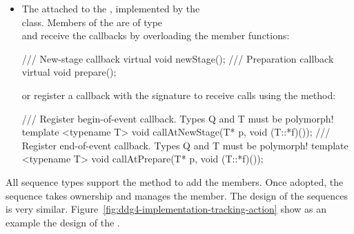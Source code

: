 \documentclass[10pt,a4paper]{article}
\begin{document}
\begin{itemize}
\item The  attached to the 
    {}, implemented by the \\
     class.
    Members of the  are of type\\
    {} and receive the callbacks by overloading the member functions:
\begin{unnumberedcode}
/// New-stage callback
virtual void newStage();
/// Preparation callback
virtual void prepare();
\end{unnumberedcode}
    or register a callback with the signature {}
    to receive calls using the method:
\begin{unnumberedcode}
/// Register begin-of-event callback. Types Q and T must be polymorph!
template <typename T> void callAtNewStage(T* p, void (T::*f)());
/// Register end-of-event callback. Types Q and T must be polymorph!
template <typename T> void callAtPrepare(T* p, void (T::*f)());
\end{unnumberedcode}
\end{itemize}

\noindent
All sequence types support the method 
to add the members. Once adopted, the sequence takes ownership and manages
the member. The design of the sequences is very similar. 
Figure~\ref{fig:ddg4-implementation-tracking-action} show as an example 
the design of the .
\end{document}

